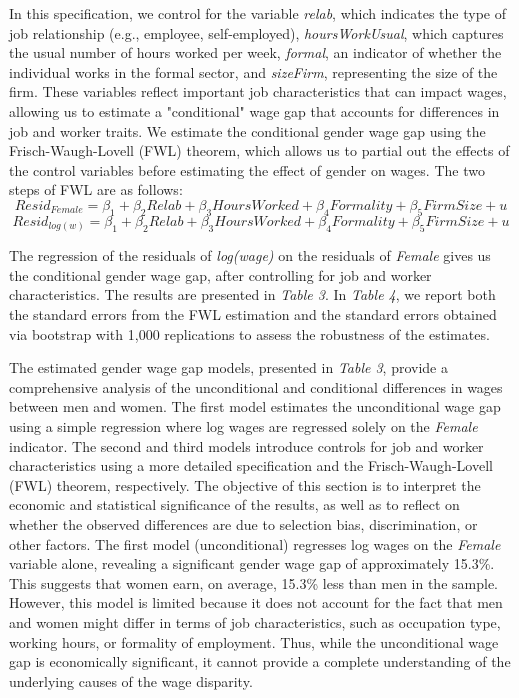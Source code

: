 \documentclass[11pt,a4paper,onecolumn]{article}
\begin{document}
        In this specification, we control for the variable \textit{relab}, which indicates the type of job relationship (e.g., employee, self-employed), \textit{hoursWorkUsual}, which captures the usual number of hours worked per week, \textit{formal}, an indicator of whether the individual works in the formal sector, and \textit{sizeFirm}, representing the size of the firm. These variables reflect important job characteristics that can impact wages, allowing us to estimate a "conditional" wage gap that accounts for differences in job and worker traits. We estimate the conditional gender wage gap using the Frisch-Waugh-Lovell (FWL) theorem, which allows us to partial out the effects of the control variables before estimating the effect of gender on wages. The two steps of FWL are as follows:
        \begin{equation}
            Resid_{Female} = \beta_1 + \beta_2 {Relab} + \beta_3 {Hours Worked} + \beta_4 {Formality} + \beta_5 {FirmSize} + u
        \end{equation}
        \begin{equation}
            Resid_{log(w)} = \beta_1 + \beta_2 {Relab} + \beta_3 {Hours Worked} + \beta_4 {Formality} + \beta_5 {FirmSize} + u
        \end{equation}


        The regression of the residuals of \textit{log(wage)} on the residuals of \textit{Female} gives us the conditional gender wage gap, after controlling for job and worker characteristics. The results are presented in \textit{Table 3}. In \textit{Table 4}, we report both the standard errors from the FWL estimation and the standard errors obtained via bootstrap with 1,000 replications to assess the robustness of the estimates.
        
        
        The estimated gender wage gap models, presented in \textit{Table 3}, provide a comprehensive analysis of the unconditional and conditional differences in wages between men and women. The first model estimates the unconditional wage gap using a simple regression where log wages are regressed solely on the \textit{Female} indicator. The second and third models introduce controls for job and worker characteristics using a more detailed specification and the Frisch-Waugh-Lovell (FWL) theorem, respectively. The objective of this section is to interpret the economic and statistical significance of the results, as well as to reflect on whether the observed differences are due to selection bias, discrimination, or other factors. The first model (unconditional) regresses log wages on the \textit{Female} variable alone, revealing a significant gender wage gap of approximately 15.3\%. This suggests that women earn, on average, 15.3\% less than men in the sample. However, this model is limited because it does not account for the fact that men and women might differ in terms of job characteristics, such as occupation type, working hours, or formality of employment. Thus, while the unconditional wage gap is economically significant, it cannot provide a complete understanding of the underlying causes of the wage disparity.
        
\end{document}
